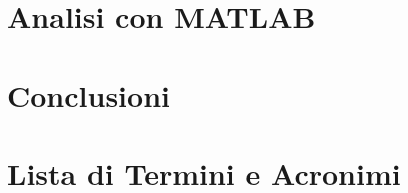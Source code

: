 \documentclass[a4paper, 11pt, italian, oneside]{book}
\begin{document}
\chapter{Analisi con MATLAB}

\chapter{Conclusioni}


\backmatter
\chapter*{Lista di Termini e Acronimi}
\printglossaries
\clearpage
{}
\printbibliography
\end{document}
